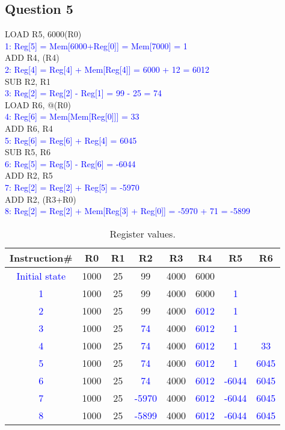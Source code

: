 \documentclass[11pt]{article}
\newcommand{\q}[1]{\subsection*{Question {#1}}}
\newcommand{\answr}[1]{\textcolor{blue}{#1}}
\newcommand{\inst}[2]{\textcolor{blue}{{#1}{#2}}}
\begin{document}
\q{5}

LOAD R5,  6000(R0) \\
\inst{1}{:} \answr{Reg[5] = Mem[6000+Reg[0]] = Mem[7000] = 1} \\
ADD R4, (R4) \\
\inst{2}{:} \answr{Reg[4] = Reg[4] + Mem[Reg[4]] = 6000 + 12 = 6012} \\
SUB R2, R1 \\
\inst{3}{:} \answr{Reg[2] = Reg[2] - Reg[1] = 99 - 25 = 74} \\
LOAD R6, @(R0) \\
\inst{4}{:} \answr{Reg[6] = Mem[Mem[Reg[0]]] = 33} \\
ADD R6, R4 \\
\inst{5}{:} \answr{Reg[6] = Reg[6] + Reg[4] = 6045} \\
SUB R5, R6 \\
\inst{6}{:} \answr{Reg[5] = Reg[5] - Reg[6] = -6044} \\
ADD R2, R5 \\
\inst{7}{:} \answr{Reg[2] = Reg[2] + Reg[5] = -5970} \\
ADD R2, (R3+R0) \\
\inst{8}{:} \answr{Reg[2] = Reg[2] + Mem[Reg[3] + Reg[0]] = -5970 + 71 = -5899}


\begin{table}[h]
\center
\begin{tabular}{|c|c|c|c|c|c|c|c|}
	\hline
	Instruction\# & R0 & R1 & R2 & R3 & R4 & R5 & R6 \\
	\hline
	\answr{Initial state} & 1000 & 25 & 99 & 4000 & 6000 & & \\
	\hline 
	\inst{1}{} & 1000 & 25 & 99 & 4000 & 6000 & \answr{1} & \\
	\hline
	\inst{2}{} & 1000 & 25 & 99 & 4000 & \answr{6012} & \answr{1} & \\
	\hline
	\inst{3}{} & 1000 & 25 & \answr{74} & 4000 & \answr{6012} & \answr{1} & \\
	\hline
	\inst{4}{} & 1000 & 25 & \answr{74} & 4000 & \answr{6012} & \answr{1} & \answr{33} \\
	\hline
	\inst{5}{} & 1000 & 25 & \answr{74} & 4000 & \answr{6012} & \answr{1} & \answr{6045} \\
	\hline
	\inst{6}{} & 1000 & 25 & \answr{74} & 4000 & \answr{6012} & \answr{-6044} & \answr{6045} \\
	\hline
	\inst{7}{} & 1000 & 25 & \answr{-5970} & 4000 & \answr{6012} & \answr{-6044} & \answr{6045} \\
	\hline
	\inst{8}{} & 1000 & 25 & \answr{-5899} & 4000 & \answr{6012} & \answr{-6044} & \answr{6045} \\
	\hline
\end{tabular}
\caption{Register values.}
\end{table}
\end{document}
